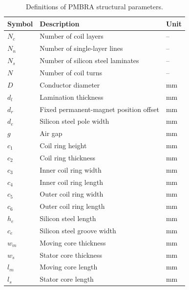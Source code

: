 \begin{table}[!t]
	\caption{Definitions of PMBRA structural parameters.}
	\label{tab:definitions}
	\centering
	\footnotesize
	\begin{tabular}{lll}
		\toprule
		Symbol & Description & Unit \\
		\midrule
		$N_c$ & Number of coil layers & -- \\
		$N_n$ & Number of single-layer lines & -- \\
		$N_s$ & Number of silicon steel laminates & -- \\
		$N$ & Number of coil turns & -- \\
		$D$ & Conductor diameter & mm \\
		$d_l$ & Lamination thickness & mm \\
		$d_r$ & Fixed permanent-magnet position offset & mm \\
		$d_e$ & Silicon steel pole width & mm \\
		$g$ & Air gap & mm \\
		$c_1$ & Coil ring height & mm \\
		$c_2$ & Coil ring thickness & mm \\
		$c_3$ & Inner coil ring width & mm \\
		$c_4$ & Inner coil ring length & mm \\
		$c_5$ & Outer coil ring width & mm \\
		$c_6$ & Outer coil ring length & mm \\
		$h_e$ & Silicon steel length & mm \\
		$c_e$ & Silicon steel groove width & mm \\
		$w_m$ & Moving core thickness & mm \\
		$w_s$ & Stator core thickness & mm \\
		$l_m$ & Moving core length & mm \\
		$l_s$ & Stator core length & mm \\
		\bottomrule
	\end{tabular}
\end{table}

